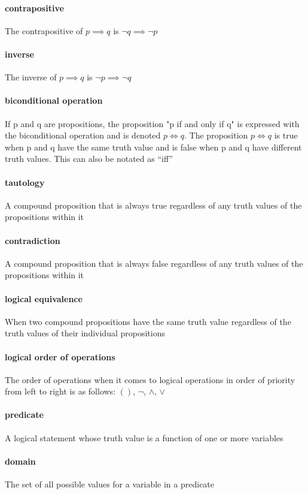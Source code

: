 \documentclass[a4paper]{article}
\begin{document}
\paragraph{contrapositive} The contrapositive of $p \implies q$ is $\lnot q \implies \lnot p$
\paragraph{inverse} The inverse of $p \implies q$ is $\lnot p \implies \lnot q$
\paragraph{biconditional operation} If p and q are propositions, the proposition "p if and only if q" is expressed with the biconditional operation and is denoted $p \iff q$. The proposition $p \iff q$ is true when p and q have the same truth value and is false when p and q have different truth values. This can also be notated as ``iff''
\paragraph{tautology} A compound proposition that is always true regardless of any truth values of the propositions within it
\paragraph{contradiction} A compound proposition that is always false regardless of any truth values of the propositions within it
\paragraph{logical equivalence} When two compound propositions have the same truth value regardless of the truth values of their individual propositions
\paragraph{logical order of operations} The order of operations when it comes to logical operations in order of priority from left to right is as follows: $()$, $\lnot$, $\land$, $\lor$
\paragraph{predicate} A logical statement whose truth value is a function of one or more variables
\paragraph{domain} The set of all possible values for a variable in a predicate
\end{document}
